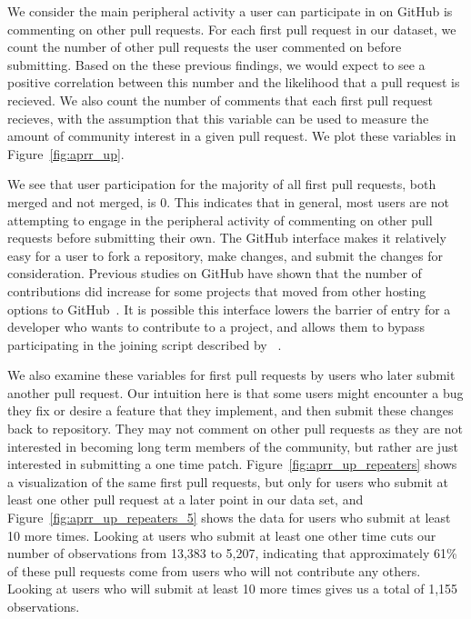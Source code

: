 \documentclass{iitthesis}
\begin{document}
We consider the main peripheral activity a user can participate in on GitHub is
commenting on other pull requests. For each first pull request in our dataset,
we count the number of other pull requests the user commented on before
submitting. Based on the these previous findings, we would expect to see a
positive correlation between this number and the likelihood that a pull request
is recieved. We also count the number of comments that each first pull request
recieves, with the assumption that this variable can be used to measure the
amount of community interest in a given pull request. We plot these variables in
Figure~\ref{fig:aprr_up}.

We see that user participation for the majority of all first pull requests, both
merged and not merged, is 0. This indicates that in general, most users are not
attempting to engage in the peripheral activity of commenting on other pull
requests before submitting their own. The GitHub interface makes it relatively
easy for a user to fork a repository, make changes, and submit the changes for
consideration. Previous studies on GitHub have shown that the number of
contributions did increase for some projects that moved from other hosting
options to GitHub~\cite{mcdonald_performance_2013}. It is possible this
interface lowers the barrier of entry for a developer who wants to contribute to
a project, and allows them to bypass participating in the joining script
described by ~\cite{von_krogh_community_2003}.

We also examine these variables for first pull requests by users who later
submit another pull request. Our intuition here is that some users might
encounter a bug they fix or desire a feature that they implement, and then
submit these changes back to repository. They may not comment on other pull
requests as they are not interested in becoming long term members of the
community, but rather are just interested in submitting a one time patch.
Figure~\ref{fig:aprr_up_repeaters} shows a visualization of the same first pull
requests, but only for users who submit at least one other pull request at a
later point in our data set, and Figure~\ref{fig:aprr_up_repeaters_5} shows the
data for users who submit at least 10 more times. Looking at users who submit
at least one other time cuts our number of observations from 13,383 to 5,207,
indicating that approximately 61\% of these pull requests come from users who
will not contribute any others. Looking at users who will submit at least 10
more times gives us a total of 1,155 observations.
\end{document}
